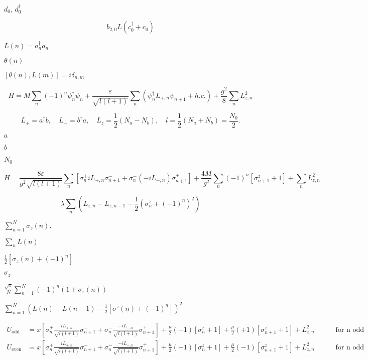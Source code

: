 \documentclass{article}
\begin{document}
{$d_0,\,d_0^{\dagger}$
\pagebreak

\[b_{2,0} L\left(c_0^{\dagger}+c_0\right)\]
\pagebreak

$ L(n) = a_n^\dagger a_n $
\pagebreak

$ \theta(n) $
\pagebreak

$ [\theta(n),L(m)]=i\delta_{n,m} $
\pagebreak

\[ H = M\sum_n (-1)^n\psi_n^\dagger\psi_n + \frac{\varepsilon}{\sqrt{l(l+1)}}\sum_n \left(\psi_n^\dagger L_{+,n}\psi_{n+1}+h.c.\right)+\frac{g^2}{8}\sum_n L_{z,n}^2\]
\pagebreak

\[L_+ = a^\dagger b,\quad L_- = b^\dagger a,\quad L_z = \frac{1}{2}(N_a - N_b),\quad l=\frac{1}{2}(N_a+N_b) = \frac{N_0}{2}. \]
\pagebreak

$ a$
\pagebreak

$ b $
\pagebreak

$ N_{0} $
\pagebreak

\[H = \frac{8\varepsilon}{g^2\sqrt{l(l+1)}}\sum_n\left[\sigma^+_n iL_{+,n}\sigma_{n+1}^- + \sigma^-_n (-iL_{-,n})\sigma_{n+1}^+\right] + \frac{4M}{g^2}\sum_n(-1)^n\left[ \sigma^z_{n+1}+1\right] + \sum_n L_{z,n}^2 \]
\pagebreak

\[ \lambda \sum_n\left( L_{z,n} - L_{z,n-1} -\frac{1}{2}\left(\sigma^z_n +(-1)^n\right)^2\right)\]
\pagebreak

$ \sum_{n=1}^N \sigma_z(n). $
\pagebreak

$ \sum_nL(n) $
\pagebreak

$ \frac{1}{2}[\sigma_z(n) + (-1)^n] $
\pagebreak

$ \sigma_z $
\pagebreak

$ \frac{\sqrt{x}}{N}\sum_{n=1}^N\left(-1\right)^n(1+\sigma_z(n)) $
\pagebreak

$ \sum_{n=1}^N\left(L(n)-L(n-1)-\frac{1}{2}\left[\sigma^z(n)+(-1)^n\right]\right)^2 $
\pagebreak

\begin{eqnarray*} U_\mathrm{odd} &= x\left[\sigma^+_{n}\frac{iL_{+,n}}{\sqrt{l(l+1)}}\sigma^-_{n+1} + \sigma^-_n \frac{-iL_{-,n}}{\sqrt{l(l+1)}}\sigma^+_{n+1} \right] + \frac{\mu}{2}(-1)\left[\sigma^z_n+1\right] + \frac{\mu}{2}(+1)\left[\sigma^z_{n+1}+1\right] + L_{z,n}^2\quad\quad\quad\mbox{for n odd} \\ U_\mathrm{even} &= x\left[\sigma^+_{n}\frac{iL_{+,n}}{\sqrt{l(l+1)}}\sigma^-_{n+1} + \sigma^-_n \frac{-iL_{-,n}}{\sqrt{l(l+1)}}\sigma^+_{n+1} \right] + \frac{\mu}{2}(+1)\left[\sigma^z_n+1\right] + \frac{\mu}{2}(-1)\left[\sigma^z_{n+1}+1\right] + L_{z,n}^2\quad\quad\quad\mbox{for n odd} \\ \end{eqnarray*}
\pagebreak

}
\end{document}
